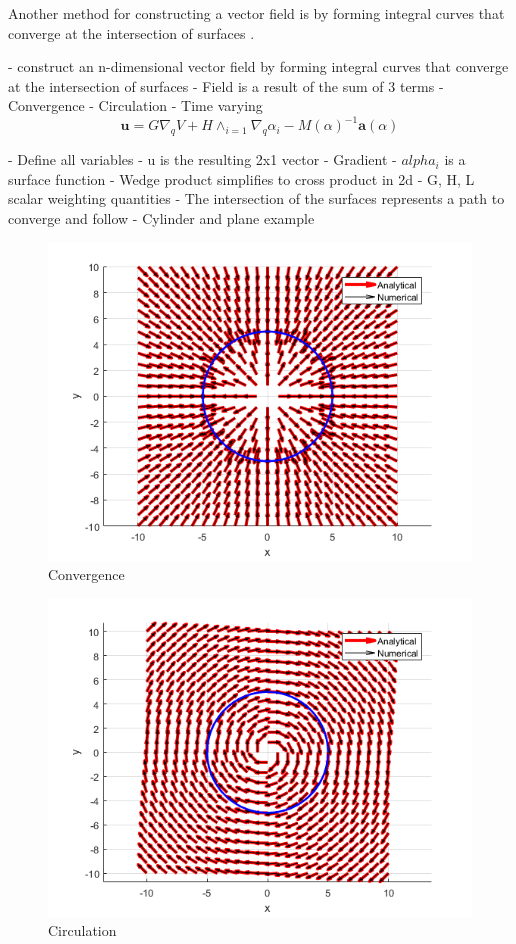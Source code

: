 \documentclass[numbered,pdftex]{ohio-etd}
\begin{document}
Another method for constructing a vector field is by forming integral curves that converge at the intersection of surfaces \cite{goncalves_artificial_2009}. 

- construct an n-dimensional vector field by forming integral curves that converge at the intersection of surfaces
- Field is a result of the sum of 3 terms
- Convergence
- Circulation
- Time varying\\


\begin{equation}\label{gonFieldeq}
\boldsymbol{u} = G\nabla_qV+H\wedge_{i=1}\nabla_q\alpha_i - M(\alpha)^{-1}\boldsymbol{a}(\alpha)
\end{equation}

- Define all variables
- u is the resulting 2x1 vector
- Gradient
- $alpha_i$ is a surface function
- Wedge product simplifies to cross product in 2d
- G, H, L scalar weighting quantities 
- The intersection of the surfaces represents a path to converge and follow
- Cylinder and plane example


\begin{figure}[h]
	\centering
	\includegraphics[width=0.7\linewidth]{PaperFigures/convergence}
	\caption{Convergence}
	\label{fig:convergence}
	
\end{figure}

\begin{figure}[h]
	\centering
	\includegraphics[width=0.7\linewidth]{PaperFigures/circulation}
	\caption{Circulation}
	\label{fig:circulation}
\end{figure}
\end{document}
